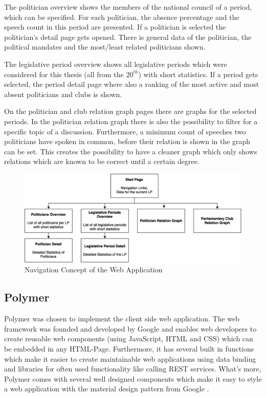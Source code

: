 The politician overview shows the members of the national council of a period, which can be specified. For each politician, the absence percentage and the speech count in this period are presented. If a politician is selected the politician's detail page gets opened. There is general data of the politician, the political mandates and the most/least related politicians shown.

The legislative period overview shows all legislative periods which were considered for this thesis (all from the $20^{th}$) with short statistics. If a period gets selected, the period detail page where also a ranking of the most active and most absent politicians and clubs is shown.

On the politician and club relation graph pages there are graphs for the selected periods. In the politician relation graph there is also the possibility to filter for a specific topic of a discussion. Furthermore, a minimum count of speeches two politicians have spoken in common, before their relation is shown in the graph can be set. This creates the possibility to have a cleaner graph which only shows relations which are known to be correct until a certain degree.

\begin{figure}
	\centering
	\includegraphics[width=\textwidth]{imgs/navigation_concept}
	\caption{Navigation Concept of the Web Application}
	\label{fig:navigation_concept}
\end{figure}

\subsection{Polymer}
\label{sec:polymer}
Polymer was chosen to implement the client side web application. The web framework was founded and developed by Google and enables web developers to create reusable web components (using JavaScript, HTML and CSS) which can be embedded in any HTML-Page. Furthermore, it has several built in functions which make it easier to create maintainable web applications using data binding and libraries for often used functionality like calling REST services. What's more, Polymer comes with several well designed components which make it easy to style a web application with the material design pattern from Google \cite{Polymer_2015}.


